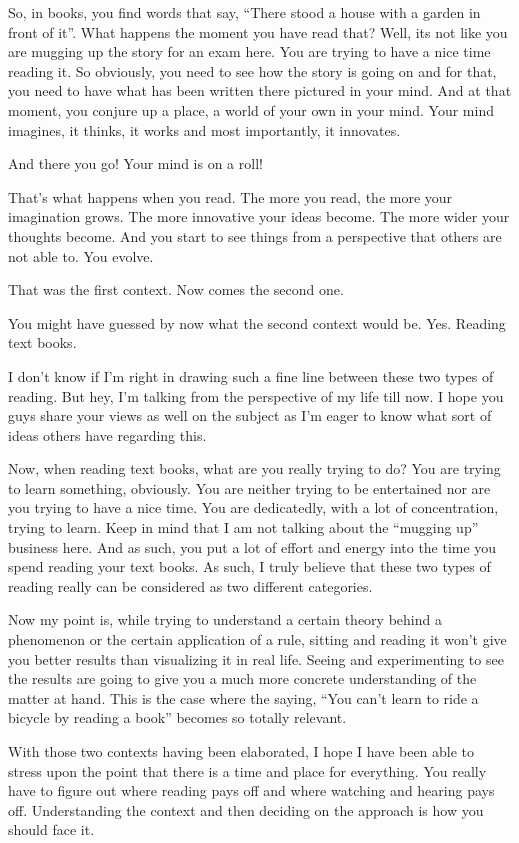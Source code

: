 \documentclass[twoside,11pt,titlepage]{article}
\begin{document}
So, in books, you find words that say, ``There stood a house with a garden in front of it''. What happens the moment you have read that? Well, its not like you are mugging up the story for an exam here. You are trying to have a nice time reading it. So obviously, you need to see how the story is going on and for that, you need to have what has been written there pictured in your mind. And at that moment, you conjure up a place, a world of your own in your mind. Your mind imagines, it thinks, it works and most importantly, it innovates.

And there you go! Your mind is on a roll!

That's what happens when you read. The more you read, the more your imagination grows. The more innovative your ideas become. The more wider your thoughts become. And you start to see things from a perspective that others are not able to. You evolve.

That was the first context. Now comes the second one.

You might have guessed by now what the second context would be. Yes. Reading text books.

I don't know if I'm right in drawing such a fine line between these two types of reading. But hey, I'm talking from the perspective of my life till now. I hope you guys share your views as well on the subject as I'm eager to know what sort of ideas others have regarding this.

Now, when reading text books, what are you really trying to do? You are trying to learn something, obviously. You are neither trying to be entertained nor are you trying to have a nice time. You are dedicatedly, with a lot of concentration, trying to learn. Keep in mind that I am not talking about the ``mugging up'' business here. And as such, you put a lot of effort and energy into the time you spend reading your text books. As such, I truly believe that these two types of reading really can be considered as two different categories.

Now my point is, while trying to understand a certain theory behind a phenomenon or the certain application of a rule, sitting and reading it won't give you better results than visualizing it in real life. Seeing and experimenting to see the results are going to give you a much more concrete understanding of the matter at hand. This is the case where the saying, ``You can't learn to ride a bicycle by reading a book'' becomes so totally relevant.

With those two contexts having been elaborated, I hope I have been able to stress upon the point that there is a time and place for everything. You really have to figure out where reading pays off and where watching and hearing pays off. Understanding the context and then deciding on the approach is how you should face it.
\end{document}
